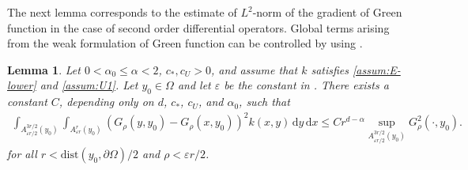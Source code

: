 \documentclass[reqno]{amsart}
\theoremstyle{plain}
\newtheorem{lemma}[theorem]{Lemma}
\theoremstyle{definition}
\numberwithin{equation}{section}
\newcommand{\dx} {\, \mathrm{d}x}
\newcommand{\dy} {\, \mathrm{d}y}
\newcommand{\cl} {c_{\ast}}
\newcommand{\cU} {c_U}
\begin{document}
The next lemma corresponds to the estimate of $L^2$-norm of the gradient of 
Green function in the case of second order differential operators. Global 
terms arising from the weak formulation of Green function can be 
controlled by using .


\begin{lemma} \label{lem:local_term}
Let $0 < \alpha_0 \leq \alpha < 2$, $\cl, \cU > 0$, and assume that $k$ satisfies \eqref{assum:E-lower} and \eqref{assum:U1}. Let $y_0 \in \Omega$ and let $\varepsilon$ be the constant in . There exists a constant $C$, depending only on $d$, $\cl$, $\cU$, and $\alpha_0$, such that
\begin{align*}
\int_{A^{3r/2}_{\varepsilon r/2}(y_0)} \int_{A^r_{\varepsilon r}(y_0)}
(G_{\rho}(y, y_0) - G_{\rho}(x, y_0))^2 k(x,y) \dy \dx
\leq C r^{d-\alpha} \sup_{A^{3r/2}_{\varepsilon r/2}(y_0)} G_{\rho}^{2}(\cdot, y_0).
\end{align*}
for all $r < \mathrm{dist}(y_0, \partial \Omega)/2$ and $\rho < \varepsilon r/2$.
\end{lemma}
\end{document}
